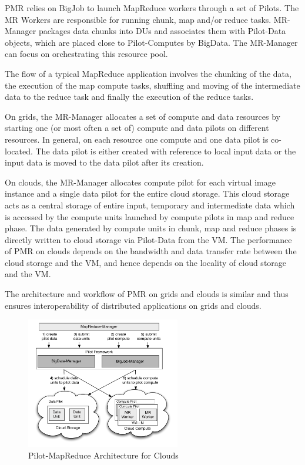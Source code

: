 \documentclass[times]{cpeauth}
\newcommand{\pilots}{Pilots\xspace}
\newcommand{\pilotcomputes}{Pilot-Computes\xspace}
\newcommand{\pilotdata}{Pilot-Data\xspace}
\newcommand{\mrmg}{MR-Manager\xspace}
\newcommand{\dus}{DUs\xspace}
\begin{document}
PMR relies on BigJob to launch MapReduce workers through a set of \pilots. 
The MR Workers are responsible for running chunk, map and/or reduce tasks. 
\mrmg packages data chunks into \dus and associates them with \pilotdata objects,
which are placed close to \pilotcomputes by BigData.  The \mrmg can
focus on orchestrating this resource pool.

The flow of a typical MapReduce application involves the chunking of
the data, the execution of the map compute tasks, shuffling and moving of
the intermediate data to the reduce task and finally the execution of
the reduce tasks. 

On grids, the \mrmg allocates a set of compute and data resources by starting one (or most often a set of) compute and data pilots on different resources.  In general, on each resource one
 compute and one data pilot is co-located. The data pilot is either created with reference to local input data or the input data is moved to the data pilot after its creation. 

On clouds, the \mrmg allocates compute pilot for each virtual image instance and a single data pilot for the entire cloud storage. This cloud storage acts as a central storage of entire input, temporary and intermediate data which is accessed by the compute units launched by compute pilots in map and reduce phase. The data generated by compute units in chunk, map and reduce phases is directly written to cloud storage via Pilot-Data from the VM. The performance of PMR on clouds depends on the bandwidth and data transfer rate between the cloud storage and the VM, and hence depends on the locality of cloud storage and the VM.

The architecture and workflow of PMR on grids and clouds is similar and thus ensures interoperability of distributed applications on grids and clouds.

\begin{figure}[t]
	\centering
		\includegraphics[width=0.6\textwidth]{figures/pmr_clouds.pdf}
                \caption{Pilot-MapReduce Architecture for Clouds}
	\label{fig:figures_pmr_clouds}
\end{figure}
\end{document}
